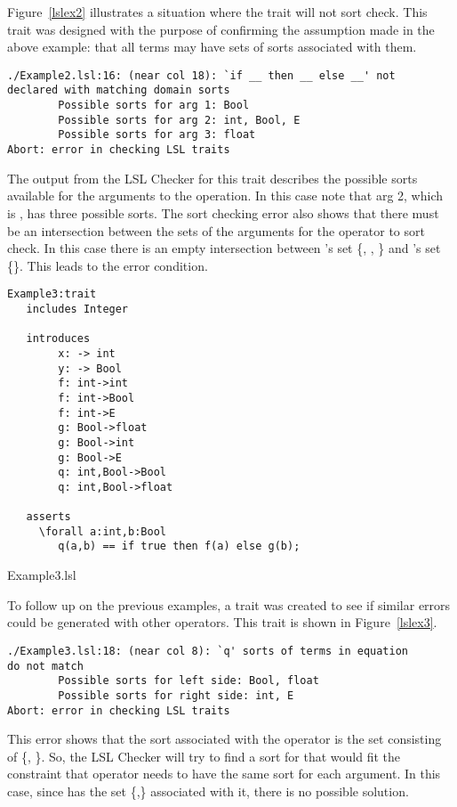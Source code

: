 Figure~\ref{lslex2} illustrates a situation where the trait will not
sort check. This trait was designed with the purpose of confirming the
assumption made in the above example: that all terms may have sets of
sorts associated with them.

\begin{verbatim}
./Example2.lsl:16: (near col 18): `if __ then __ else __' not 
declared with matching domain sorts
        Possible sorts for arg 1: Bool
        Possible sorts for arg 2: int, Bool, E
        Possible sorts for arg 3: float
Abort: error in checking LSL traits
\end{verbatim}

The output from the LSL Checker for this trait describes the possible
sorts available for the arguments to the 
operation. In this case note that arg 2, which is , has
three possible sorts. The sort checking error also shows that there
must be an intersection between the sets of the arguments for the
operator to sort check. In this case there is an empty intersection between
's set \{, , \}
and 's set \{\}. This leads to the
error condition.

\begin{BFIGURE}
\begin{verbatim}
Example3:trait
   includes Integer

   introduces
        x: -> int
        y: -> Bool
        f: int->int
        f: int->Bool
        f: int->E
        g: Bool->float
        g: Bool->int
        g: Bool->E
        q: int,Bool->Bool
        q: int,Bool->float

   asserts
     \forall a:int,b:Bool
        q(a,b) == if true then f(a) else g(b);
\end{verbatim}
\caption{Example3.lsl}
\label{lslex3}
\end{BFIGURE}

To follow up on the previous examples, a trait was created to see if
similar errors could be generated with other operators. This trait is
shown in Figure~\ref{lslex3}. 
\begin{verbatim}
./Example3.lsl:18: (near col 8): `q' sorts of terms in equation 
do not match
        Possible sorts for left side: Bool, float
        Possible sorts for right side: int, E
Abort: error in checking LSL traits
\end{verbatim}

\noindent This error shows that the sort associated with the
 operator is the set consisting of
\{, \}. So, the LSL Checker will try to find
a sort for  that would fit the constraint that
operator \reserved{==} needs to have the same sort for each
argument. In this case, since  has the set
\{,\} associated with it, there is no
possible solution.

